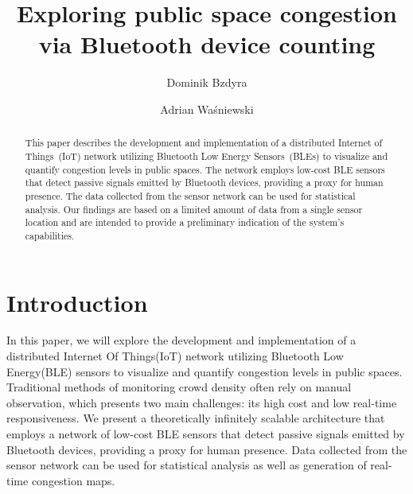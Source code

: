 \documentclass[runningheads]{llncs}
\begin{document}
%
\title{Exploring public space congestion via Bluetooth device counting}
%
%
\author{Dominik Bzdyra \and Adrian Waśniewski}
%
%
%
\maketitle              %
%
\begin{abstract}
This paper describes the development and implementation of a distributed Internet of Things~(IoT) network utilizing Bluetooth Low Energy Sensors~(BLEs) to visualize and quantify congestion levels in public spaces. The network employs low-cost BLE sensors that detect passive signals emitted by Bluetooth devices, providing a proxy for human presence. The data collected from the sensor network can be used for statistical analysis. Our findings are based on a limited amount of data from a single sensor location and are intended to provide a preliminary indication of the system's capabilities.

\end{abstract}
%
%
%
\section{Introduction}
In this paper, we will explore the development and implementation of a distributed Internet Of Things(IoT) network utilizing Bluetooth Low Energy(BLE) sensors to visualize and quantify congestion levels in public spaces. Traditional methods of monitoring crowd density often rely on manual observation, which presents two main challenges: its high cost and low real-time responsiveness. We present a theoretically infinitely scalable architecture that employs a network of low-cost BLE sensors that detect passive signals emitted by Bluetooth devices, providing a proxy for human presence. Data collected from the sensor network can be used for statistical analysis as well as generation of real-time congestion maps.
\end{document}
